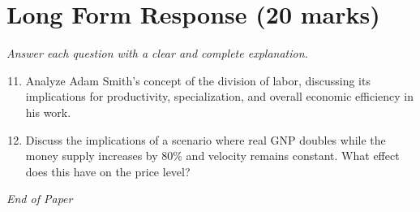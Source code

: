 \documentclass[12pt]{article}
\begin{document}
\section*{Long Form Response (20 marks)}
\textit{Answer each question with a clear and complete explanation.}
\begin{enumerate}[label=\arabic*.]
\setcounter{enumi}{10}
\item Analyze Adam Smith's concept of the division of labor, discussing its implications for productivity, specialization, and overall economic efficiency in his work.
\item Discuss the implications of a scenario where real GNP doubles while the money supply increases by 80\% and velocity remains constant. What effect does this have on the price level?
\end{enumerate}

\vfill
\noindent\textit{End of Paper}
\end{document}
